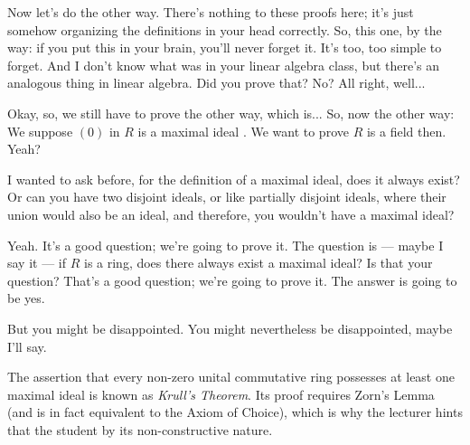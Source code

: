 \begin{speech}[00:14:48 - 00:15:30]
Now let's do the other way. There's nothing to these proofs here; it's just somehow organizing the definitions in your head correctly. So, this one, by the way: if you put this in your brain, you'll never forget it. It's too, too simple to forget. And I don't know what was in your linear algebra class, but there's an analogous thing in linear algebra. Did you prove that? No? All right, well... 
\end{speech}

\begin{speech}[00:15:58 - 00:16:17]
Okay, so, we still have to prove the other way, which is... So, now the other way: We suppose $(0)$ in $R$ is a maximal ideal . We want to prove $R$ is a field then. Yeah?
\end{speech}

\begin{student}
I wanted to ask before, for the definition of a maximal ideal, does it always exist? Or can you have two disjoint ideals, or like partially disjoint ideals, where their union would also be an ideal, and therefore, you wouldn't have a maximal ideal?
\end{student}

\begin{speech}[00:16:30 - 00:16:51]
Yeah. It's a good question; we're going to prove it. The question is --- maybe I say it --- if $R$ is a ring, does there always exist a maximal ideal? Is that your question? That's a good question; we're going to prove it. The answer is going to be yes.

But you might be disappointed. You might nevertheless be disappointed, maybe I'll say.
\end{speech}

\begin{aiNote}
The assertion that every non-zero unital commutative ring possesses at least one maximal ideal is known as \emph{Krull's Theorem}. Its proof requires Zorn's Lemma (and is in fact equivalent to the Axiom of Choice), which is why the lecturer hints that the student  by its non-constructive nature.
\end{aiNote}

